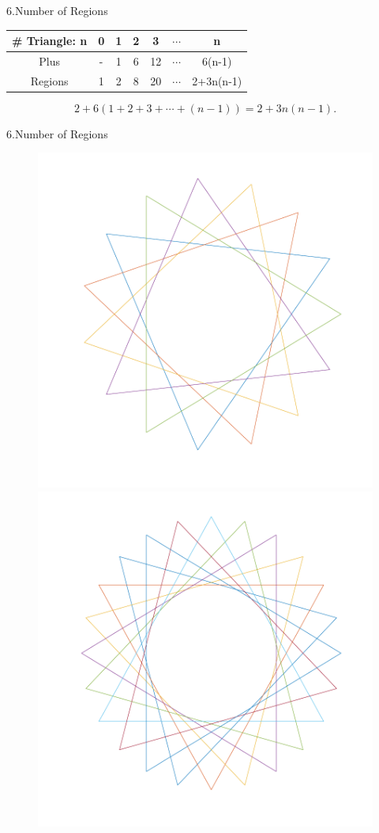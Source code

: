 \documentclass{beamer}
\begin{document}
\begin{frame}{6.Number of Regions}
	\begin{table}
		\begin{tabular}{c|c|c|c|c|c|c}
			\hline
			\# Triangle: n&0&1&2&3&$ \cdots $&n\\
			\hline
			Plus&-&1&6&12&$ \cdots $&6(n-1)\\
			\hline
			Regions&1&2&8&20&$ \cdots $&2+3n(n-1)\\
			\hline
		\end{tabular}
	\end{table}
\[2+6(1+2+3+\cdots+(n-1))=2+3n(n-1).\]
\end{frame}
\begin{frame}{6.Number of Regions}
	\begin{figure}
		\includegraphics[width=0.49\textheight]{5.pdf}
		\includegraphics[width=0.49\textheight]{8.pdf}

\end{figure}
\end{frame}
\end{document}
